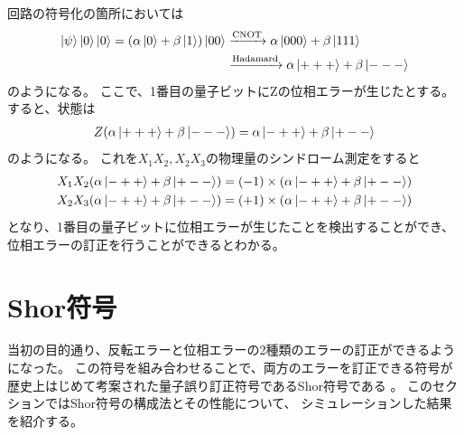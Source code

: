 \documentclass[../master.tex]{subfiles}
\begin{document}
回路の符号化の箇所においては
\begin{equation}\begin{aligned}[b]
    \ket{\psi}\ket{0}\ket{0} = \qty(\alpha\ket{0}+\beta\ket{1})\ket{00}
    &\xrightarrow{\text{CNOT}} \alpha\ket{000}+\beta\ket{111}\\
    &\xrightarrow{\text{Hadamard}} \alpha\ket{+++}+\beta\ket{---}
\end{aligned}\end{equation}
のようになる。
ここで、1番目の量子ビットにZの位相エラーが生じたとする。
すると、状態は
\begin{equation}\begin{aligned}[b]
    Z\qty(\alpha\ket{+++}+\beta\ket{---})
    = \alpha\ket{-++}+\beta\ket{+--}
\end{aligned}\end{equation}
のようになる。
これを\(X_1X_2,X_2X_3\)の物理量のシンドローム測定をすると
\begin{equation}\begin{aligned}[b]
    X_1X_2\qty(\alpha\ket{-++}+\beta\ket{+--})
    &= (-1)\times\qty(\alpha\ket{-++}+\beta\ket{+--})\\
    X_2X_3\qty(\alpha\ket{-++}+\beta\ket{+--})
    &= (+1)\times\qty(\alpha\ket{-++}+\beta\ket{+--})
\end{aligned}\end{equation}
となり、1番目の量子ビットに位相エラーが生じたことを検出することができ、
位相エラーの訂正を行うことができるとわかる。


\section{Shor符号}
当初の目的通り、反転エラーと位相エラーの2種類のエラーの訂正ができるようになった。
この符号を組み合わせることで、両方のエラーを訂正できる符号が
歴史上はじめて考案された量子誤り訂正符号であるShor符号である
\cite{Shor1995-ii}。
このセクションではShor符号の構成法とその性能について、
シミュレーションした結果を紹介する。
\end{document}
